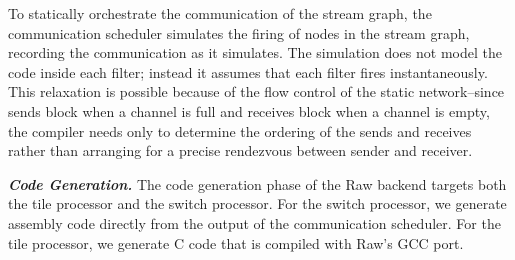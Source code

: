 To statically orchestrate the communication of the stream graph, the
communication scheduler simulates the firing of nodes in the stream
graph, recording the communication as it simulates.  The simulation
does not model the code inside each filter; instead it assumes that
each filter fires instantaneously.  This relaxation is possible
because of the flow control of the static network--since sends block
when a channel is full and receives block when a channel is empty, the
compiler needs only to determine the ordering of the sends and
receives rather than arranging for a precise rendezvous between sender
and receiver.

{\bf {\em Code Generation.}} The code generation phase of the Raw
backend targets both the tile processor and the switch processor.  For
the switch processor, we generate assembly code directly from the
output of the communication scheduler.  For the tile processor, we
generate C code that is compiled with Raw's GCC port.

